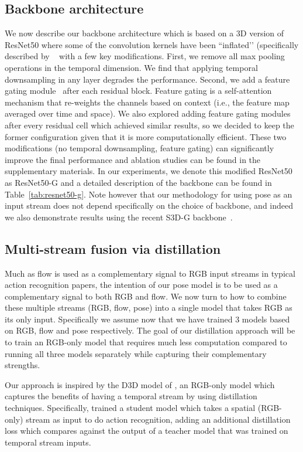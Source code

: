 \documentclass[letterpaper]{article} \usepackage{aaai21}  \usepackage{times}  \usepackage{helvet} \usepackage{courier}  \usepackage[hyphens]{url}  \usepackage{graphicx} \urlstyle{rm} \def\UrlFont{\rm}  \usepackage{natbib}  \usepackage{caption} \frenchspacing  \setlength{\pdfpagewidth}{8.5in}  \setlength{\pdfpageheight}{11in}
\begin{document}
\subsection{Backbone architecture}
We now describe our backbone architecture which is based on a 3D version of ResNet50 where some of the convolution kernels have been ``inflated’’ (specifically described by ~\citet{wang2018non} with a few key modifications. First, we remove all max pooling operations in the temporal dimension. We find that applying temporal downsampling in any layer degrades the performance. Second, we add a feature gating module~\cite{xie2018rethinking} after each residual block. Feature gating is a self-attention mechanism that re-weights the channels based on  context (i.e., the feature map averaged over time and space). We also explored adding feature gating modules after every residual cell which achieved similar results, so we decided to keep the former configuration given that it is more computationally efficient. These two modifications (no temporal downsampling, feature gating) can significantly improve the final performance and  ablation studies can be found in the supplementary materials. In our experiments, we denote this modified ResNet50 as ResNet50-G and a detailed description of the backbone can be found in Table~\ref{tab:resnet50-g}.  Note however that our methodology for using pose as an input stream does not depend specifically on the choice of backbone,
and indeed we also demonstrate results using the recent S3D-G 
backbone~\cite{xie2018rethinking}.

\subsection{Multi-stream fusion via distillation}
\label{section:multi-distillation}


Much as flow is used as a complementary signal to RGB input streams in typical action recognition papers, the intention of our pose model is to be used as a complementary signal to both RGB and flow. We now turn to how to combine these multiple streams (RGB, flow, pose) into a single model that takes RGB as its only input.   Specifically we assume now that we have trained 3 models based on RGB, flow and pose respectively.  The goal of our distillation approach will be to train an RGB-only model that requires much less computation compared to running all three models separately while capturing their complementary strengths.

Our approach is inspired by the D3D model of \citet{stroud2020d3d}, an RGB-only model which captures the benefits of having a temporal stream by using distillation 
techniques.  Specifically, \citeauthor{stroud2020d3d} trained a student model which takes a spatial (RGB-only) stream as input to do action recognition, adding an additional distillation loss which
compares against the output of a teacher model that was trained on temporal stream inputs.
\end{document}
